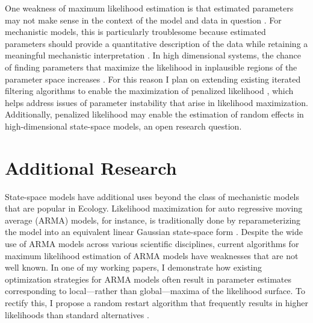 \documentclass{article}
\begin{document}
One weakness of maximum likelihood estimation is that estimated parameters may not make sense in the context of the model and data in question \cite{lecam90}.
For mechanistic models, this is particularly troublesome because estimated parameters should provide a quantitative description of the data while retaining a meaningful mechanistic interpretation \cite{wheeler24}.
In high dimensional systems, the chance of finding parameters that maximize the likelihood in inplausible regions of the parameter space increases \cite{li24}.
For this reason I plan on extending existing iterated filtering algorithms \cite{ionides15,ionides22} to enable the maximization of penalized likelihood \cite{cole13}, which helps address issues of parameter instability that arise in likelihood maximization.
Additionally, penalized likelihood may enable the estimation of random effects in high-dimensional state-space models, an open research question.



\section{Additional Research}

State-space models have additional uses beyond the class of mechanistic models that are popular in Ecology.
Likelihood maximization for auto regressive moving average (ARMA) models, for instance, is traditionally done by reparameterizing the model into an equivalent linear Gaussian state-space form \cite{gardner80, durbin12}.
Despite the wide use of ARMA models across various scientific disciplines, current algorithms for maximum likelihood estimation of ARMA models have weaknesses that are not well known.
In one of my working papers, I demonstrate how existing optimization strategies for ARMA models often result in parameter estimates corresponding to local---rather than global---maxima of the likelihood surface.
To rectify this, I propose a random restart algorithm that frequently results in higher likelihoods than standard alternatives \cite{wheelerARMA}.
\end{document}
